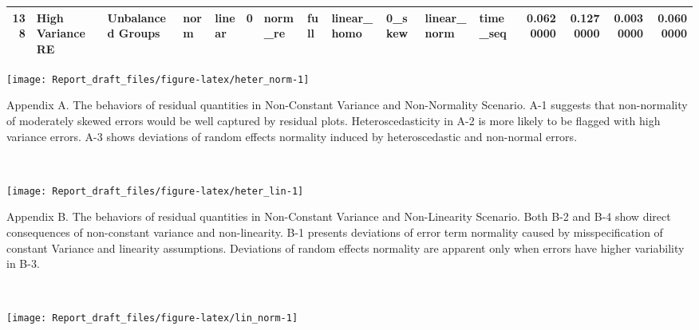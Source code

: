 \documentclass[12pt]{article}
\begin{document}
\begin{table}
{\begin{tabular}[t]{rllllrllllllrrrr}
138 & High Variance RE & Unbalanced Groups & norm & linear & 0 & norm\_re & full & linear\_homo & 0\_skew & linear\_norm & time\_seq & 0.0620000 & 0.1270000 & 0.0030000 & 0.0600000\\
\bottomrule
\end{tabular}}
\end{table}

\begin{center}\texttt{[image: Report\_draft\_files/figure-latex/heter\_norm-1]} \end{center}

\vspace{-10pt}

\begin{spacing}{0.5}
\begingroup
{}\fontsize{6}{16}\selectfont
Appendix A. The behaviors of residual quantities in Non-Constant Variance and Non-Normality Scenario.
A-1 suggests that non-normality of moderately skewed errors would be well captured by residual plots. Heteroscedasticity in A-2 is more likely to be flagged with high variance errors. A-3 shows deviations of random effects normality induced by heteroscedastic and non-normal errors. 
\endgroup
\end{spacing}

~

\begin{center}\texttt{[image: Report\_draft\_files/figure-latex/heter\_lin-1]} \end{center}

\vspace{-10pt}

\begin{spacing}{0.5}
\begingroup
{}\fontsize{6}{16}\selectfont
Appendix B. The behaviors of residual quantities in Non-Constant Variance and Non-Linearity Scenario.
Both B-2 and B-4 show direct consequences of non-constant variance and non-linearity. B-1 presents deviations of error term normality caused by misspecification of constant Variance and linearity assumptions. Deviations of random effects normality are apparent only when errors have higher variability in B-3. 
\endgroup
\end{spacing}

~

\begin{center}\texttt{[image: Report\_draft\_files/figure-latex/lin\_norm-1]} \end{center}
\end{document}
